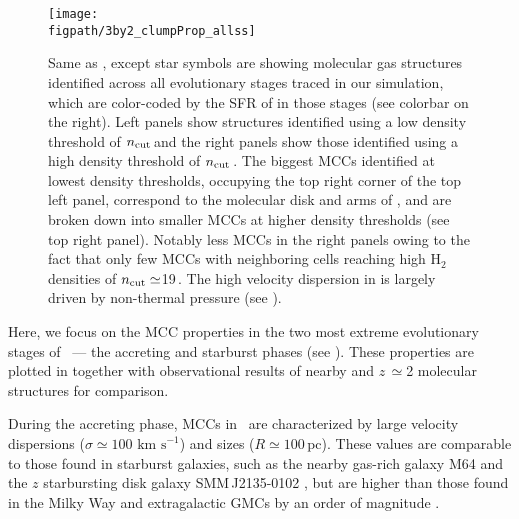 \IfFileExists{emulateapjlegacy.cls}{\documentclass[iop]{emulateapjlegacy}}{\documentclass[iop]{emulateapj}}
\def\figpath{./Fig}
\begin{document}
\begin{figure*}
\centering
\texttt{[image: \\figpath/3by2\_clumpProp\_allss]}
\caption{Same as , except star symbols are showing molecular gas structures identified across all evolutionary stages traced in our simulation, which are color-coded by the SFR of \flower in those stages (see colorbar on the right). Left panels show structures identified using a low density threshold of $n_{\rm cut}$\,\cc and the right panels show those identified using a high density threshold of $n_{\rm cut}$\,\cc.
%
The biggest MCCs identified at lowest density thresholds, occupying the top right corner of the top left panel, correspond to the molecular disk and arms of \flower, and are broken down into smaller MCCs at higher density thresholds (see top right panel).
%
Notably less MCCs in the right panels owing to the fact that only few MCCs with neighboring cells reaching high H$_2$ densities of $n_{\rm cut}\simeq$19\,\cc. The high velocity dispersion in \flower is largely driven by non-thermal pressure (see ).
\label{fig:alpha16-28}}
\end{figure*}

Here, we focus on the MCC properties in the two most extreme evolutionary stages of \flower\ --- the accreting and starburst phases (see ). These properties are plotted in  together with observational results of nearby and $z$\,$\simeq$2 molecular structures for comparison.

During the accreting phase, MCCs in \flower\ are characterized by large velocity dispersions ($\sigma \simeq 100 \mbox{ km s}^{-1}$) and sizes ($R\simeq 100$\,pc). These values are comparable to those found in starburst galaxies, such as the nearby gas-rich galaxy M64 and the $z$ starbursting disk galaxy SMM\,J2135-0102 \citep{Rosolowsky05a, Swinbank11a}, but are higher than those found in the Milky Way and extragalactic GMCs by an order of magnitude \citep{Heyer04a, Bolatto08a}.
\end{document}
